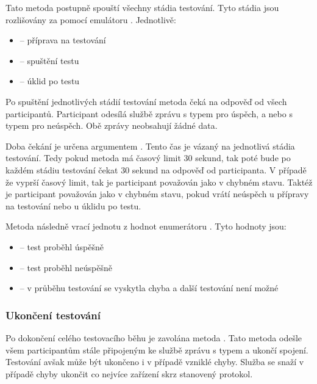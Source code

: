 Tato metoda postupně spouští všechny stádia testování. Tyto stádia jsou rozlišovány za pomocí emulátoru . Jednotlivě:

\begin{itemize}
    \item {} -- příprava na testování
    \item {} -- spuštění testu
    \item {} -- úklid po testu
\end{itemize}

Po spuštění jednotlivých stádií testování metoda čeká na odpověď od všech participantů. Participant odesílá službě zprávu s typem  pro úspěch, a nebo s typem  pro neúspěch. Obě zprávy neobsahují žádné data.

Doba čekání je určena argumentem . Tento čas je vázaný na jednotlivá stádia testování. Tedy pokud metoda má časový limit 30 sekund, tak poté bude po každém stádiu testování čekat 30 sekund na odpověď od participanta. V případě že vyprší časový limit, tak je participant považován jako v chybném stavu. Taktéž je participant považován jako v chybném stavu, pokud vrátí neúspěch u přípravy na testování nebo u úklidu po testu.

Metoda následně vrací jednotu z hodnot enumerátoru . Tyto hodnoty jsou:

\begin{itemize}
    \item {} -- test proběhl úspěšně
    \item {} -- test proběhl neúspěšně
    \item {} -- v průběhu testování se vyskytla chyba a další testování není možné   
\end{itemize}


\subsubsection{Ukončení testování}

Po dokončení celého testovacího běhu je zavolána metoda . Tato metoda odešle všem participantům stále připojeným ke službě zprávu s typem  a ukončí spojení. Testování avšak může být ukončeno i v případě vzniklé chyby. Služba se snaží v případě chyby ukončit co nejvíce zařízení skrz stanovený protokol.


